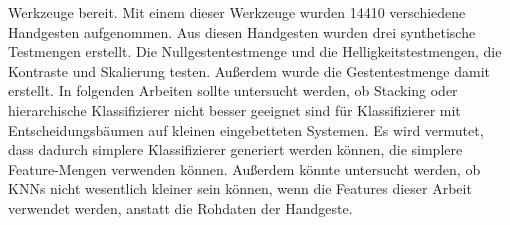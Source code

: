 Werkzeuge bereit. Mit einem dieser Werkzeuge wurden 14410 verschiedene Handgesten aufgenommen. Aus diesen Handgesten wurden drei synthetische Testmengen erstellt. Die Nullgestentestmenge und die
Helligkeitstestmengen, die Kontraste und Skalierung testen. Außerdem wurde die Gestentestmenge damit erstellt.
\newline
\newline
In folgenden Arbeiten sollte untersucht werden, ob Stacking oder hierarchische Klassifizierer nicht besser geeignet sind für Klassifizierer mit Entscheidungsbäumen auf kleinen eingebetteten Systemen.
Es wird vermutet, dass dadurch simplere Klassifizierer generiert werden können, die simplere Feature-Mengen verwenden können. Außerdem könnte untersucht werden, ob KNNs nicht wesentlich kleiner sein
können, wenn die Features dieser Arbeit verwendet werden, anstatt die Rohdaten der Handgeste.